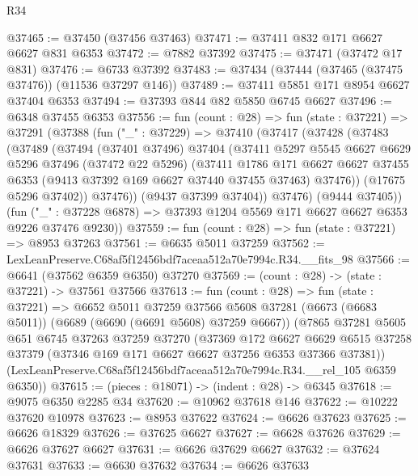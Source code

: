 \begin{lexlean}{R34}
\begin{coremodule}
@37465 := @37450 (@37456 @37463)
@37471 := @37411 @832 @171 @6627 @6627 @831 @6353
@37472 := @7882 @37392
@37475 := @37471 (@37472 @17 @831)
@37476 := @6733 @37392
@37483 := @37434 (@37444 (@37465 (@37475 @37476)) (@11536 @37297 @146))
@37489 := @37411 @5851 @171 @8954 @6627 @37404 @6353
@37494 := @37393 @844 @82 @5850 @6745 @6627
@37496 := @6348 @37455 @6353
@37556 := fun (count : @28) =>
  fun (state : @37221) =>
  @37291
    (@37388
      (fun ("_" : @37229) =>
      @37410
        (@37417
          (@37428
            (@37483
              (@37489
                (@37494
                  (@37401 @37496)
                  @37404
                  (@37411
                    @5297
                    @5545
                    @6627
                    @6629
                    @5296
                    @37496
                    (@37472 @22 @5296)
                    (@37411
                      @1786
                      @171
                      @6627
                      @6627
                      @37455
                      @6353
                      (@9413 @37392 @169 @6627 @37440 @37455 @37463)
                      @37476))
                  (@17675 @5296 @37402))
                @37476))
            (@9437 @37399 @37404))
          @37476)
        (@9444 @37405))
      (fun ("_" : @37228 @6878) => @37393 @1204 @5569 @171 @6627 @6627 @6353 @9226 @37476 @9230))
@37559 := fun (count : @28) => fun (state : @37221) => @8953 @37263
@37561 := @6635 @5011 @37259
@37562 := LexLeanPreserve.C68af5f12456bdf7aceaa512a70e7994c.R34.__fits_98
@37566 := @6641 (@37562 @6359 @6350) @37270
@37569 := (count : @28) -> (state : @37221) -> @37561 @37566
@37613 := fun (count : @28) =>
  fun (state : @37221) =>
  @6652
    @5011
    @37259
    @37566
    @5608
    @37281
    (@6673 (@6683 @5011))
    (@6689 (@6690 (@6691 @5608) @37259 @6667))
    (@7865
      @37281
      @5605
      @651
      @6745
      @37263
      @37259
      @37270
      (@37369
        @172
        @6627
        @6629
        @6515
        @37258
        @37379
        (@37346 @169 @171 @6627 @6627 @37256 @6353 @37366 @37381))
      (LexLeanPreserve.C68af5f12456bdf7aceaa512a70e7994c.R34.__rel_105 @6359 @6350))
@37615 := (pieces : @18071) -> (indent : @28) -> @6345
@37618 := @9075 @6350 @2285 @34
@37620 := @10962 @37618 @146
@37622 := @10222 @37620 @10978
@37623 := @8953 @37622
@37624 := @6626 @37623
@37625 := @6626 @18329
@37626 := @37625 @6627
@37627 := @6628 @37626
@37629 := @6626 @37627 @6627
@37631 := @6626 @37629 @6627
@37632 := @37624 @37631
@37633 := @6630 @37632
@37634 := @6626 @37633

\end{coremodule}
\end{lexlean}
